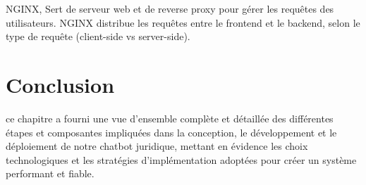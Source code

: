 NGINX, Sert de serveur web et de reverse proxy pour gérer les requêtes des utilisateurs. NGINX distribue les requêtes entre le frontend et le backend, selon le type de requête (client-side vs server-side).

\section{Conclusion}

ce chapitre a fourni une vue d'ensemble complète et détaillée des différentes étapes et composantes impliquées dans la conception, le développement et le déploiement de notre chatbot juridique, mettant en évidence les choix technologiques et les stratégies d'implémentation adoptées pour créer un système performant et fiable.

